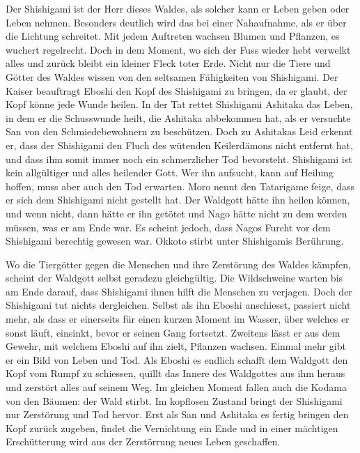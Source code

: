 Der Shishigami ist der Herr dieses Waldes, als solcher kann er Leben geben oder Leben nehmen. Besonders deutlich wird das bei einer Nahaufnahme, als er über die Lichtung schreitet. Mit jedem Auftreten wachsen Blumen und Pflanzen, es wuchert regelrecht. Doch in dem Moment, wo sich der Fuss wieder hebt verwelkt alles und zurück bleibt ein kleiner Fleck toter Erde. Nicht nur die Tiere und Götter des Waldes wissen von den seltsamen Fähigkeiten von Shishigami. Der Kaiser beauftragt Eboshi den Kopf des Shishigami zu bringen, da er glaubt, der Kopf könne jede Wunde heilen. In der Tat rettet Shishigami Ashitaka das Leben, in dem er die Schusswunde heilt, die Ashitaka abbekommen hat, als er versuchte San von den Schmiedebewohnern zu beschützen. Doch zu Ashitakas Leid erkennt er, dass der Shishigami den Fluch des wütenden Keilerdämons nicht entfernt hat, und dass ihm somit immer noch ein schmerzlicher Tod bevorsteht. Shishigami ist kein allgültiger und alles heilender Gott. Wer ihn aufsucht, kann auf Heilung hoffen, muss aber auch den Tod erwarten. Moro nennt den Tatarigame feige, dass er sich dem Shishigami nicht gestellt hat. Der Waldgott hätte ihn heilen können, und wenn nicht, dann hätte er ihn getötet und Nago hätte nicht zu dem werden müssen, was er am Ende war. Es scheint jedoch, dass Nagos Furcht vor dem Shishigami berechtig gewesen war. Okkoto stirbt unter Shishigamis Berührung. 

Wo die Tiergötter gegen die Menschen und ihre Zerstörung des Waldes kämpfen, scheint der Waldgott selbst geradezu gleichgültig. Die Wildschweine warten bis am Ende darauf, dass Shishigami ihnen hilft die Menschen zu verjagen. Doch der Shishigami tut nichts dergleichen. Selbst als ihn Eboshi anschiesst, passiert nicht mehr, als dass er einerseits für einen kurzen Moment im Wasser, über welches er sonst läuft, einsinkt, bevor er seinen Gang fortsetzt. Zweitens lässt er aus dem Gewehr, mit welchem Eboshi auf ihn zielt, Pflanzen wachsen. Einmal mehr gibt er ein Bild von Leben und Tod. Als Eboshi es endlich schafft dem Waldgott den Kopf vom Rumpf zu schiessen, quillt das Innere des Waldgottes aus ihm heraus und zerstört alles auf seinem Weg. Im gleichen Moment fallen auch die Kodama von den Bäumen: der Wald stirbt. Im kopflosen Zustand bringt der Shishigami nur Zerstörung und Tod hervor. Erst als San und Ashitaka es fertig bringen den Kopf zurück zugeben, findet die Vernichtung ein Ende und in einer mächtigen Erschütterung wird aus der Zerstörrung neues Leben geschaffen. 
